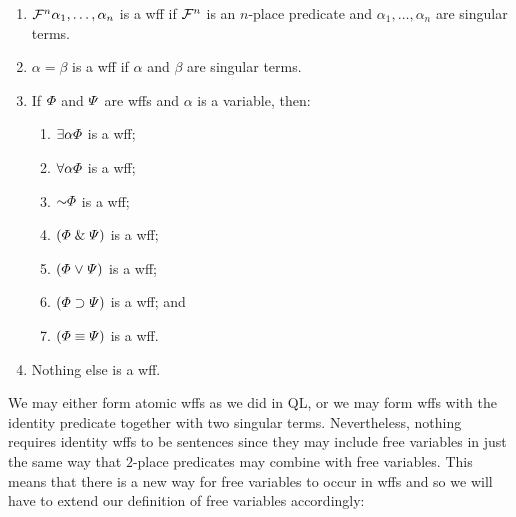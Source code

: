\begin{enumerate}
  \item $\mathcal{F}^n\alpha_1,\ldots,\alpha_n$ is a wff if $\mathcal{F}^n$ is an $n$-place predicate and $\alpha_1,\ldots,\alpha_n$ are singular terms.
  \item $\alpha=\beta$ is a wff if $\alpha$ and $\beta$ are singular terms.
\item If $\varPhi$ and $\varPsi$ are wffs and $\alpha$ is a variable, then:
	\begin{enumerate}
      \item $\exists \alpha\varPhi$ is a wff;
      \item $\forall \alpha\varPhi$ is a wff;
      \item $\enot\metaA$ is a wff;
      \item $(\varPhi\mathrel\&\varPsi)$ is a wff;
      \item $(\varPhi\mkern1mu\vee\mkern1mu\varPsi)$ is a wff;
      \item $(\varPhi\supset\varPsi)$ is a wff; and
      \item $(\varPhi\equiv\varPsi)$ is a wff.
	\end{enumerate}
\item Nothing else is a wff.
\end{enumerate}

We may either form atomic wffs as we did in QL, or we may form wffs with the identity predicate together with two singular terms.
Nevertheless, nothing requires identity wffs to be sentences since they may include free variables in just the same way that $2$-place predicates may combine with free variables.
This means that there is a new way for free variables to occur in wffs and so we will have to extend our definition of free variables accordingly:

